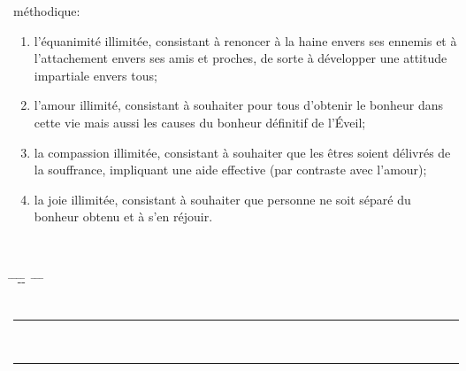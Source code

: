 \begin{tabbing}
{  méthodique:
  \begin{enumerate}
    \item l'équanimité illimitée, consistant à renoncer à la haine
      envers ses ennemis et à l'attachement envers ses amis et
      proches, de sorte à développer une attitude impartiale envers
      tous;
  \item l'amour illimité, consistant à souhaiter pour tous d'obtenir
    le bonheur dans cette vie mais aussi les causes du bonheur
    définitif de l'Éveil;
  \item la compassion illimitée, consistant à souhaiter que les êtres
    soient délivrés de la souffrance, impliquant une aide effective
    (par contraste avec l'amour);
  \item la joie illimitée, consistant à souhaiter que personne ne soit
    séparé du bonheur obtenu et à s'en réjouir.
\end {enumerate}}\\
\>
\qquad\qquad\quad {}\\ \=
\=-\=-\= \ \= \=
\=\\ \>
\>\,\rule[3pt]{8.5mm}{.4pt}
\>\,\rule[3pt]{14mm}{.4pt} \>
\> \> \>\\ \>
\> \> \> \>
\> \>\\ \> \>\>\>\>
\end{tabbing}

\newpage

